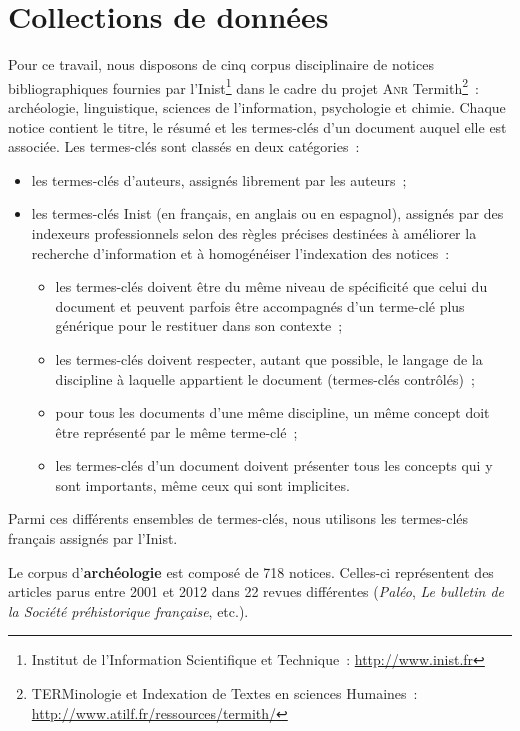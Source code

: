 \section{Collections de données}
\label{sec:presentation_des_donnees}
  Pour ce travail, nous disposons de cinq corpus disciplinaire de notices
  bibliographiques fournies par l'Inist\footnote{Institut de l'Information
  Scientifique et Technique~: \url{http://www.inist.fr}} dans le cadre du projet
  \textsc{Anr} Termith\footnote{TERMinologie et Indexation de Textes en sciences
  Humaines~: \url{http://www.atilf.fr/ressources/termith/}}~: archéologie,
  linguistique, sciences de l'information, psychologie et chimie. Chaque notice
  contient le titre, le résumé et les termes-clés d'un document auquel elle est
  associée. Les termes-clés sont classés en deux catégories~:
  \begin{itemize}
    \item{les termes-clés d'auteurs, assignés librement par les auteurs~;}
    \item{les termes-clés Inist (en français, en anglais ou en espagnol),
          assignés par des indexeurs professionnels selon des règles précises
          destinées à améliorer la recherche d'information et à homogénéiser
          l'indexation des notices~:}
    \begin{itemize}
      \item{les termes-clés doivent être du même niveau de spécificité que celui
            du document et peuvent parfois être accompagnés d'un terme-clé plus
            générique pour le restituer dans son contexte~;}
      \item{les termes-clés doivent respecter, autant que possible, le langage
            de la discipline à laquelle appartient le document (termes-clés
            contrôlés)~;}
      \item{pour tous les documents d'une même discipline, un même concept doit
            être représenté par le même terme-clé~;}
      \item{les termes-clés d'un document doivent présenter tous les concepts
            qui y sont importants, même ceux qui sont implicites.}
    \end{itemize}
  \end{itemize}
  Parmi ces différents ensembles de termes-clés, nous utilisons les termes-clés
  français assignés par l'Inist.

  Le corpus d'\textbf{archéologie} est composé de 718 notices. Celles-ci
  représentent des articles parus entre 2001 et 2012 dans 22 revues différentes
  (\textit{Paléo}, \textit{Le bulletin de la Société préhistorique française},
  etc.).

